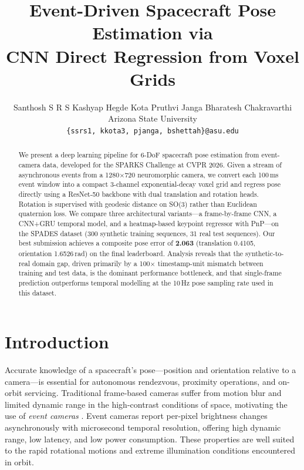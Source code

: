 \documentclass[10pt,twocolumn,letterpaper]{article}
\begin{document}
\title{Event-Driven Spacecraft Pose Estimation via\\
CNN Direct Regression from Voxel Grids}

\author{Santhosh S R S \quad Kashyap Hegde Kota \quad
        Pruthvi Janga \quad Bharatesh Chakravarthi \\
        \small{Arizona State University} \\
        \texttt{\{ssrs1, kkota3, pjanga, bshettah\}@asu.edu}
}

\maketitle

\begin{abstract}
We present a deep learning pipeline for 6-DoF spacecraft pose estimation
from event-camera data, developed for the SPARKS Challenge at CVPR 2026.
Given a stream of asynchronous events from a 1280$\times$720 neuromorphic
camera, we convert each 100\,ms event window into a compact 3-channel
exponential-decay voxel grid and regress pose directly using a
ResNet-50 backbone with dual translation and rotation heads.
Rotation is supervised with geodesic distance on SO(3) rather
than Euclidean quaternion loss.  We compare three architectural
variants—a frame-by-frame CNN, a CNN+GRU temporal model, and a
heatmap-based keypoint regressor with PnP—on the SPADES dataset
(300 synthetic training sequences, 31 real test sequences).
Our best submission achieves a composite pose error of \textbf{2.063}
(translation 0.4105, orientation 1.6526\,rad) on the final leaderboard.
Analysis reveals that the synthetic-to-real domain gap, driven
primarily by a 100$\times$ timestamp-unit mismatch between training
and test data, is the dominant performance bottleneck, and that
single-frame prediction outperforms temporal modelling at the
10\,Hz pose sampling rate used in this dataset.
\end{abstract}

\section{Introduction}
\label{sec:intro}

Accurate knowledge of a spacecraft's pose—position and orientation
relative to a camera—is essential for autonomous rendezvous, proximity
operations, and on-orbit servicing.  Traditional frame-based cameras
suffer from motion blur and limited dynamic range in the high-contrast
conditions of space, motivating the use of \emph{event cameras}
\cite{gallego2020event}.  Event cameras report per-pixel brightness
changes asynchronously with microsecond temporal resolution, offering
high dynamic range, low latency, and low power consumption.  These
properties are well suited to the rapid rotational motions and extreme
illumination conditions encountered in orbit.
\end{document}
